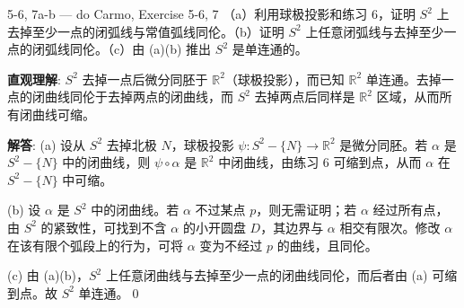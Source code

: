 \begin{exercise}{5-6, 7a-b — do Carmo, Exercise 5-6, 7}
（a）利用球极投影和练习 6，证明 $S^2$ 上去掉至少一点的闭弧线与常值弧线同伦。（b）证明 $S^2$ 上任意闭弧线与去掉至少一点的闭弧线同伦。（c）由 (a)(b) 推出 $S^2$ 是单连通的。
\end{exercise}
\begin{solution}
\textbf{直观理解}: $S^2$ 去掉一点后微分同胚于 $\mathbb{R}^2$（球极投影），而已知 $\mathbb{R}^2$ 单连通。去掉一点的闭曲线同伦于去掉两点的闭曲线，而 $S^2$ 去掉两点后同样是 $\mathbb{R}^2$ 区域，从而所有闭曲线可缩。

\textbf{解答}: (a) 设从 $S^2$ 去掉北极 $N$，球极投影 $\psi: S^2-\{N\}\to\mathbb{R}^2$ 是微分同胚。若 $\alpha$ 是 $S^2-\{N\}$ 中的闭曲线，则 $\psi\circ\alpha$ 是 $\mathbb{R}^2$ 中闭曲线，由练习 6 可缩到点，从而 $\alpha$ 在 $S^2-\{N\}$ 中可缩。

(b) 设 $\alpha$ 是 $S^2$ 中的闭曲线。若 $\alpha$ 不过某点 $p$，则无需证明；若 $\alpha$ 经过所有点，由 $S^2$ 的紧致性，可找到不含 $\alpha$ 的小开圆盘 $D$，其边界与 $\alpha$ 相交有限次。修改 $\alpha$ 在该有限个弧段上的行为，可将 $\alpha$ 变为不经过 $p$ 的曲线，且同伦。

(c) 由 (a)(b)，$S^2$ 上任意闭曲线与去掉至少一点的闭曲线同伦，而后者由 (a) 可缩到点。故 $S^2$ 单连通。\qed
\end{solution}

